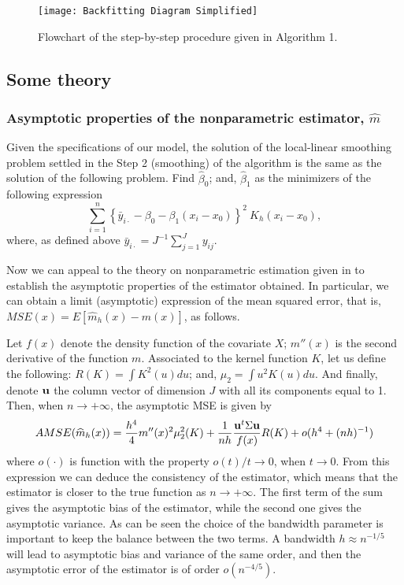 \documentclass[sn-mathphys]{sn-jnl}%
\theoremstyle{thmstyleone}%
\theoremstyle{thmstyletwo}%
\theoremstyle{thmstylethree}%
\begin{document}
\begin{figure}[H]
	\centering
	\texttt{[image: Backfitting Diagram Simplified]}
	\caption{Flowchart of the step-by-step procedure given in Algorithm 1.}
	\label{fig:flowchart}
\end{figure}

\subsection{Some theory}
\subsubsection{Asymptotic properties of the nonparametric estimator, $\widehat{m}$}
Given the specifications of our model, the solution of the local-linear smoothing problem settled in the Step 2 (smoothing) of the algorithm is the same as the solution of the following problem. Find $\widehat{\beta}_0$; and, $\widehat{\beta}_1$ as the minimizers of the following expression
 \[
 \sum_{i=1}^n\left\{\bar{y}_{i\cdot}-\beta_0-\beta_1(x_i-x_0)\right\}^2 \ K_h\left(x_i-x_0\right),%
 \]
where, as defined above  $\bar{y}_{i \cdot} =J^{-1}\sum_{j=1}^Jy_{ij}$. 

Now we can appeal to the theory on nonparametric estimation given in \cite{FG1996} to establish the asymptotic properties of the estimator obtained. In particular, we can obtain a limit (asymptotic)  expression of the mean squared error, that is, $MSE(x)=E\left[\widehat{m}_h(x)-m(x)\right]$, as follows. 

Let $f(x)$ denote the density function of the covariate $X$; $m''(x)$ is the second derivative of the function $m$. Associated to the kernel function $K$, let us define the following: $R(K)=\int K^2(u)du$; and, $\mu_2=\int u^2K(u)du$. And finally, denote ${\bf u}$ the column vector of dimension $J$ with all its components equal to 1. Then, when $n \rightarrow +\infty$, the asymptotic MSE is given by
\begin{equation*}
AMSE(\widehat{m}_h(x))=\frac{h^4}{4}m''(x)^2\mu_2^2(K)+\frac{1}{nh}\frac{{\bf u}^t { \Sigma} {\bf u}}{f(x)}R(K)+o(h^4+(nh)^{-1})
\end{equation*}
where $o(\cdot)$ is function with the property $o(t)/t \rightarrow 0$, when $t \rightarrow 0$. From this expression we can deduce the consistency of the estimator, which means that the estimator is closer to the true function as $n \rightarrow +\infty$. 
The first term of the sum gives the asymptotic bias of the estimator, while the second one gives the asymptotic variance. As can be seen the choice of the bandwidth parameter is important to keep the balance between the two terms. A bandwidth $h \approx n^{-1/5}$ will lead to asymptotic bias and variance of the same order, and then the asymptotic error of the estimator is of order $o(n^{-4/5})$. 
\end{document}
